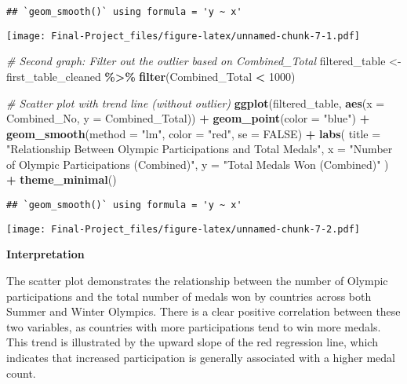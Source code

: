 \documentclass[
]{article}
\newenvironment{Shaded}{\begin{snugshade}}{\end{snugshade}}
\newcommand{\AttributeTok}[1]{\textcolor[rgb]{0.13,0.29,0.53}{#1}}
\newcommand{\CommentTok}[1]{\textcolor[rgb]{0.56,0.35,0.01}{\textit{#1}}}
\newcommand{\ConstantTok}[1]{\textcolor[rgb]{0.56,0.35,0.01}{#1}}
\newcommand{\DecValTok}[1]{\textcolor[rgb]{0.00,0.00,0.81}{#1}}
\newcommand{\FunctionTok}[1]{\textcolor[rgb]{0.13,0.29,0.53}{\textbf{#1}}}
\newcommand{\NormalTok}[1]{#1}
\newcommand{\OtherTok}[1]{\textcolor[rgb]{0.56,0.35,0.01}{#1}}
\newcommand{\SpecialCharTok}[1]{\textcolor[rgb]{0.81,0.36,0.00}{\textbf{#1}}}
\newcommand{\StringTok}[1]{\textcolor[rgb]{0.31,0.60,0.02}{#1}}
\begin{document}
\begin{verbatim}
## `geom_smooth()` using formula = 'y ~ x'
\end{verbatim}

\texttt{[image: Final-Project\_files/figure-latex/unnamed-chunk-7-1.pdf]}

\begin{Shaded}
\begin{Highlighting}[]
\CommentTok{\# Second graph: Filter out the outlier based on Combined\_Total}
\NormalTok{filtered\_table }\OtherTok{\textless{}{-}}\NormalTok{ first\_table\_cleaned }\SpecialCharTok{\%\textgreater{}\%}
  \FunctionTok{filter}\NormalTok{(Combined\_Total }\SpecialCharTok{\textless{}} \DecValTok{1000}\NormalTok{)  }

\CommentTok{\# Scatter plot with trend line (without outlier)}
\FunctionTok{ggplot}\NormalTok{(filtered\_table, }\FunctionTok{aes}\NormalTok{(}\AttributeTok{x =}\NormalTok{ Combined\_No, }\AttributeTok{y =}\NormalTok{ Combined\_Total)) }\SpecialCharTok{+}
  \FunctionTok{geom\_point}\NormalTok{(}\AttributeTok{color =} \StringTok{"blue"}\NormalTok{) }\SpecialCharTok{+} 
  \FunctionTok{geom\_smooth}\NormalTok{(}\AttributeTok{method =} \StringTok{"lm"}\NormalTok{, }\AttributeTok{color =} \StringTok{"red"}\NormalTok{, }\AttributeTok{se =} \ConstantTok{FALSE}\NormalTok{) }\SpecialCharTok{+} 
  \FunctionTok{labs}\NormalTok{(}
    \AttributeTok{title =} \StringTok{"Relationship Between Olympic Participations and Total Medals"}\NormalTok{,}
    \AttributeTok{x =} \StringTok{"Number of Olympic Participations (Combined)"}\NormalTok{,}
    \AttributeTok{y =} \StringTok{"Total Medals Won (Combined)"}
\NormalTok{  ) }\SpecialCharTok{+}
  \FunctionTok{theme\_minimal}\NormalTok{()}
\end{Highlighting}
\end{Shaded}

\begin{verbatim}
## `geom_smooth()` using formula = 'y ~ x'
\end{verbatim}

\texttt{[image: Final-Project\_files/figure-latex/unnamed-chunk-7-2.pdf]}

\textbf{Interpretation}

The scatter plot demonstrates the relationship between the number of
Olympic participations and the total number of medals won by countries
across both Summer and Winter Olympics. There is a clear positive
correlation between these two variables, as countries with more
participations tend to win more medals. This trend is illustrated by the
upward slope of the red regression line, which indicates that increased
participation is generally associated with a higher medal count.
\end{document}
